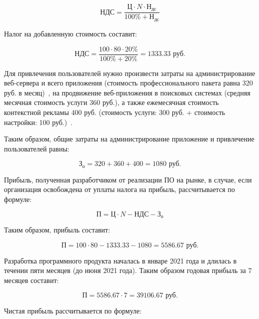 \begin{equation}
    \textit{НДС} = \frac{\textit{Ц} \cdot \textit{N} \cdot \textit{Н}_\textit{дс}}{100\% + \textit{Н}_\textit{дс}}
\end{equation}

Налог на добавленную стоимость составит:

\begin{equation*}
    \textit{НДС} = \frac{100 \cdot 80 \cdot 20\%}{100\% + 20\%} = 1333.33 \textrm{ руб.}
\end{equation*}

Для привлечения пользователей нужно произвести затраты на администрирование веб-сервера и всего приложения (стоимость профессионального пакета равна 320 руб. в месяц)~\cite{admin_web_server}, на продвижение веб-приложения в поисковых системах (средняя месячная стоимость услуги 360 руб.), а также ежемесячная стоимость контекстной рекламы 400 руб. (стоимость услуги: 300 руб. + стоимость настройки: 100 руб.)~\cite{contex_advertisment}.

Таким образом, общие затраты на администрирование приложение и привлечение пользователей равны:

\begin{equation*}
    \textit{З}_\textit{о} = 320 + 360 + 400 = 1080 \textrm{ руб.}
\end{equation*}

Прибыль, полученная разработчиком от реализации ПО на рынке, в случае, если организация освобождена от уплаты налога на прибыль, рассчитывается по формуле:

\begin{equation}
    \textit{П} = \textit{Ц} \cdot \textit{N} - \textit{НДС} -\textit{З}_\textit{о}
\end{equation}

Таким образом, прибыль составит:

\begin{equation*}
    \textit{П} = 100 \cdot 80 - 1333.33 - 1080 = 5586.67 \textrm{ руб.}
\end{equation*}

Разработка программного продукта началась в январе 2021 года и длилась в течении пяти месяцев (до июня 2021 года). Таким образом годовая прибыль за 7 месяцев составит:

\begin{equation*}
    \textit{П} = 5586.67 \cdot 7 = 39106.67  \textrm{ руб.}
\end{equation*}

Чистая прибыль рассчитывается по формуле:

